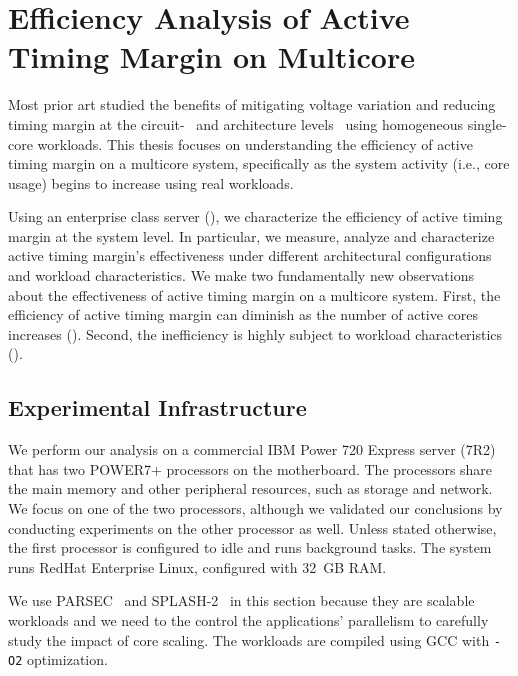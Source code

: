 \section{Efficiency Analysis of Active Timing Margin on Multicore}
\label{sec:voltage:characterization}

Most prior art studied the benefits of mitigating voltage variation and reducing timing margin at the circuit-~\cite{kurd2008next,bowman201222nm,grenat20145,tokunaga20145,bowman20158} and architecture levels~\cite{lefurgy2011active,reddi2009voltage,gupta2008decor,powell2003pipeline,reddi2010voltage,bertran2014voltage} using homogeneous single-core workloads. This thesis focuses on understanding the efficiency of active timing margin on a multicore system, specifically as the system activity (i.e., core usage) begins to increase using real workloads.

Using an enterprise class server (), we characterize the efficiency of active timing margin at the system level. In particular, we measure, analyze and characterize active timing margin's effectiveness under different architectural configurations and workload characteristics. We make two fundamentally new observations about the effectiveness of active timing margin on a multicore system. First, the efficiency of active timing margin can diminish as the number of active cores increases (). Second, the inefficiency is highly subject to workload characteristics ().

\subsection{Experimental Infrastructure}
\label{sec:voltage:characterization:setup}
 
We perform our analysis on a commercial IBM Power 720 Express server (7R2) that has two POWER7+ processors on the motherboard. The processors share the main memory and other peripheral resources, such as storage and network. We focus on one of the two processors, although we validated our conclusions by conducting experiments on the other processor as well. Unless stated otherwise, the first processor is configured to idle and runs background tasks. The system runs RedHat Enterprise Linux, configured with 32~GB RAM. 

We use PARSEC~\cite{bienia2008parsec} and SPLASH-2~\cite{woo1995splash,bienia2008parsecsplash} in this section because they are scalable workloads and we need to the control the applications' parallelism to carefully study the impact of core scaling. The workloads are compiled using GCC with \texttt{-O2} optimization.

